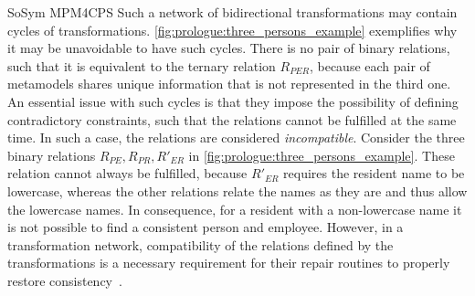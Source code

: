 \begin{copiedFrom}{SoSym MPM4CPS}
Such a network of bidirectional transformations may contain cycles of transformations.
\autoref{fig:prologue:three_persons_example} exemplifies why it may be unavoidable to have such cycles. 
There is no pair of binary relations, such that it is equivalent to the ternary relation $R_{PER}$, because each pair of metamodels shares unique information that is not represented in the third one. %
An essential issue with such cycles is that they impose the possibility of defining contradictory constraints, such that the relations cannot be fulfilled at the same time.
In such a case, the relations are considered \emph{incompatible}.
Consider the three binary relations $R_{PE}, R_{PR}, R'_{ER}$ in \autoref{fig:prologue:three_persons_example}.
These relation cannot always be fulfilled, because $R'_{ER}$ requires the resident name to be lowercase, whereas the other relations relate the names as they are and thus allow the lowercase names.
In consequence, for a resident with a non-lowercase name it is not possible to find a consistent person and employee.
However, in a transformation network, compatibility of the relations defined by the transformations is a necessary requirement for their repair routines to properly restore consistency~\cite{klare2019icmt}.



\end{copiedFrom}
